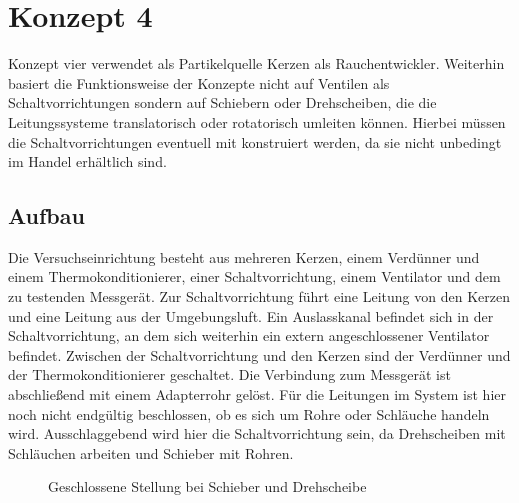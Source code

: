 \section{Konzept 4}
Konzept vier verwendet als Partikelquelle Kerzen als Rauchentwickler. Weiterhin basiert die Funktionsweise der Konzepte nicht auf Ventilen als Schaltvorrichtungen sondern auf Schiebern oder Drehscheiben, die die Leitungssysteme translatorisch oder rotatorisch umleiten k\"{o}nnen. Hierbei m\"{u}ssen die Schaltvorrichtungen eventuell mit konstruiert werden, da sie nicht unbedingt im Handel erh\"{a}ltlich sind.

\subsection{Aufbau}
Die Versuchseinrichtung besteht aus mehreren Kerzen, einem Verd\"{u}nner und einem Thermokonditionierer, einer Schaltvorrichtung, einem Ventilator und dem zu testenden Messger\"{a}t. Zur Schaltvorrichtung f\"{u}hrt eine Leitung von den Kerzen und eine Leitung aus der Umgebungsluft. Ein Auslasskanal befindet sich in der Schaltvorrichtung, an dem sich weiterhin ein extern angeschlossener Ventilator befindet. Zwischen der Schaltvorrichtung und den Kerzen sind der Verd\"{u}nner und der Thermokonditionierer geschaltet. Die Verbindung zum Messger\"{a}t ist abschlie{\ss}end mit einem Adapterrohr gel\"{o}st. F\"{u}r die Leitungen im System ist hier noch nicht endg\"{u}ltig beschlossen, ob es sich um Rohre oder Schl\"{a}uche handeln wird. Ausschlaggebend wird hier die Schaltvorrichtung sein, da Drehscheiben mit Schl\"{a}uchen arbeiten und Schieber mit Rohren.
\begin{figure}[H]
        \myfloatalign
         \quad
        \caption[Geschlossene Stellung bei Schieber und Drehscheibe]
        {Geschlossene Stellung bei Schieber und Drehscheibe}
        \label{fig:concepts_4_off}
\end{figure}

